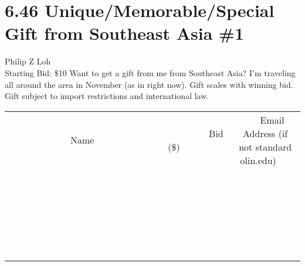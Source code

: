 \documentclass[11pt]{article}
\begin{document}
\section*{6.46 Unique/Memorable/Special Gift from Southeast Asia \#1}
Philip Z Loh
\\
Starting Bid: \$10
\newline
Want to get a gift from me from Southeast Asia? I'm traveling all around the area in November (as in right now). Gift scales with winning bid. Gift subject to import restrictions and international law.
\\[6ex]
\begin{tabular}{c c c}
~~~~~~~~~~~~~Name~~~~~~~~~~~~~ & ~~~~~~~~~Bid (\$)~~~~~~~~~  & ~~~Email Address (if not standard olin.edu)~~~\\
 & & \\
\hline
 & & \\
\hline
 & & \\
\hline
 & & \\
\hline
 & & \\
\hline
 & & \\
\hline
 & & \\
\hline
 & & \\
\hline
 & & \\
\hline
 & & \\
\hline
 & & \\
\hline
 & & \\
\hline
 & & \\
\hline
 & & \\
\hline
 & & \\
\hline
 & & \\
\hline
 & & \\
\hline
 & & \\
\hline
 & & \\
\hline
 & & \\
\hline
 & & \\
\hline
 & & \\
\hline
 & & \\
\hline
 & & \\
\hline
 & & \\
\hline
 & & \\
\hline
\end{tabular}
\newpage
\end{document}
